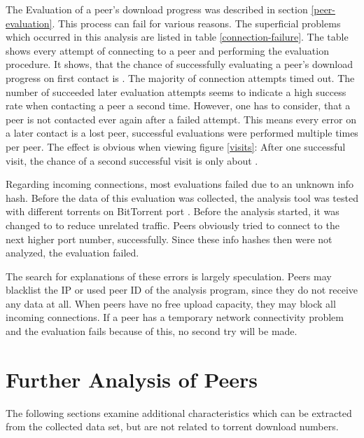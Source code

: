 \documentclass[10pt, a4paper, twoside=false, headsepline]{scrbook}
\renewcommand{\_}{\origunderscore\allowbreak}
\begin{document}
The Evaluation of a peer's download progress was described in section \ref{peer-evaluation}. This process can fail for various reasons. The superficial problems which occurred in this analysis are listed in table \ref{connection-failure}. The table shows every attempt of connecting to a peer and performing the evaluation procedure. It shows, that the chance of successfully evaluating a peer's download progress on first contact is . The majority of connection attempts timed out. The number of  succeeded later evaluation attempts seems to indicate a high success rate when contacting a peer a second time. However, one has to consider, that a peer is not contacted ever again after a failed attempt. This means every error on a later contact is a lost peer, successful evaluations were performed multiple times per peer. The effect is obvious when viewing figure \ref{visits}: After one successful visit, the chance of a second successful visit is only about .

Regarding incoming connections, most evaluations failed due to an unknown info hash. Before the data of this evaluation was collected, the analysis tool was tested with different torrents on BitTorrent port . Before the analysis started, it was changed to  to reduce unrelated traffic. Peers obviously tried to connect to the next higher port number, successfully. Since these info hashes then were not analyzed, the evaluation failed.

The search for explanations of these errors is largely speculation. Peers may blacklist the IP or used peer ID of the analysis program, since they do not receive any data at all. When peers have no free upload capacity, they may block all incoming connections. If a peer has a temporary network connectivity problem and the evaluation fails because of this, no second try will be made.

\section{Further Analysis of Peers}
The following sections examine additional characteristics which can be extracted from the collected data set, but are not related to torrent download numbers.
\end{document}
